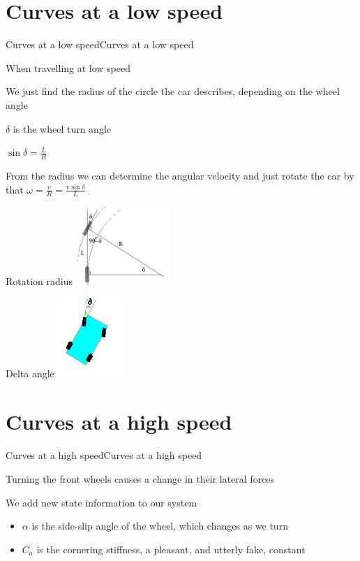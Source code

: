 \documentclass{beamer}
\begin{document}
\section{Curves at a low speed}
\begin{slide}{Curves at a low speed}{Curves at a low speed}{
\item When travelling at low speed
\item We just find the radius of the circle the car describes, depending on the wheel angle
\item $\delta$ is the wheel turn angle
\item $\sin \delta = \frac{L}{R}$
\item From the radius we can determine the angular velocity and just rotate the car by that
$\omega = \frac{v}{R} = \frac{v \sin \delta}{L}$
}\end{slide}

\begin{frame}{Rotation radius}
\center
\includegraphics[height=3cm]{Pics/RotationRadius.png}
\end{frame}

\begin{frame}{Delta angle}
\center
\includegraphics[height=3cm]{Pics/DeltaAngle.png}
\end{frame}

\section{Curves at a high speed}
\begin{slide}{Curves at a high speed}{Curves at a high speed}{
\item Turning the front wheels causes a change in their lateral forces
\item We add new state information to our system
\begin{itemize}
\item $\alpha$ is the side-slip angle of the wheel, which changes as we turn
\item $C_a$ is the cornering stiffness, a pleasant, and utterly fake, constant
\end{itemize}
}\end{slide}
\end{document}
